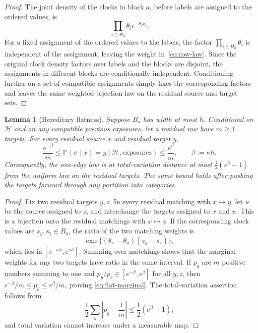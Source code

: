 \documentclass[11pt]{article}
\newcommand{\Pp}{\mathbb P}
\newcommand{\1}{\mathbf 1}
\newcommand{\cH}{\mathcal H}
\newtheorem{lemma}[theorem]{Lemma}
\theoremstyle{definition}
\theoremstyle{remark}
\begin{document}
\begin{proof}
The joint density of the clocks in block $a$, before labels are assigned
to the ordered values, is
\[
  \prod_{i\in H_a}\theta_i e^{-\theta_i x_i}.
\]
For a fixed assignment of the ordered values to the labels, the factor
$\prod_{i\in H_a}\theta_i$ is independent of the assignment, leaving the
weight in~\eqref{eq:row-law}.  Since the original clock density factors
over labels and the blocks are disjoint, the assignments in different
blocks are conditionally independent.  Conditioning further on a set of
compatible assignments simply fixes the corresponding factors and
leaves the same weighted-bijection law on the residual source and target
sets.
\end{proof}

\begin{lemma}[Hereditary flatness]
\label{lem:flatness}
Suppose $B_a$ has width at most $h$.  Conditional on $\cH$ and on any
compatible previous exposures, let a residual row have $m\geq1$ targets.
For every residual source $x$ and residual target $y$,
\begin{equation}\label{eq:flat-marginal}
  \frac{e^{-\beta}}m
  \leq
  \Pp(\sigma(x)=y\mid\cH,\text{exposures})
  \leq
  \frac{e^{\beta}}m,
  \qquad \beta:=\kappa h.
\end{equation}
Consequently, the one-edge law is at total-variation distance at most
$\frac12(e^\beta-1)$ from the uniform law on the residual targets.  The same
bound holds after pushing the targets forward through any partition into
categories.
\end{lemma}

\begin{proof}
Fix two residual targets $y,z$.  In every residual matching with
$x\mapsto y$, let $u$ be the source assigned to $z$, and interchange the
targets assigned to $x$ and $u$.  This is a bijection onto the residual
matchings with $x\mapsto z$.  If the corresponding clock values are
$s_y,s_z\in B_a$, the ratio of the two matching weights is
\[
 \exp\{(\theta_x-\theta_u)(s_y-s_z)\},
\]
which lies in $[e^{-\kappa h},e^{\kappa h}]$.  Summing over matchings
shows that the marginal weights for any two targets have ratio in the
same interval.  If $p_y$ are $m$ positive numbers summing to one and
$p_y/p_z\in[e^{-\beta},e^\beta]$ for all $y,z$, then
$e^{-\beta}/m\leq p_y\leq e^\beta/m$, proving
\eqref{eq:flat-marginal}.  The total-variation assertion follows from
\[
  \frac12\sum_y\left|p_y-\frac1m\right|
  \leq \frac12(e^\beta-1),
\]
and total variation cannot increase under a measurable map.
\end{proof}
\end{document}
